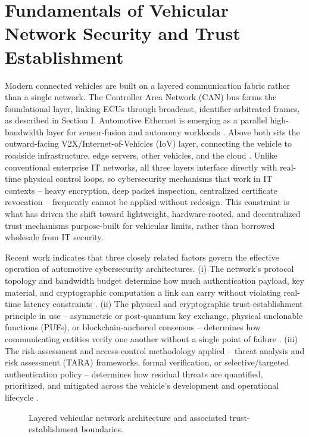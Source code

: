 \documentclass[journal]{IEEEtran}
\begin{document}
	\section{Fundamentals of Vehicular Network Security and Trust Establishment}
	
	Modern connected vehicles are built on a layered communication fabric
	rather than a single network. The Controller Area Network (CAN) bus
	forms the foundational layer, linking ECUs through broadcast,
	identifier-arbitrated frames, as described in Section I. Automotive
	Ethernet is emerging as a parallel high-bandwidth layer for
	sensor-fusion and autonomy workloads \cite{ref28}. Above both sits the
	outward-facing V2X/Internet-of-Vehicles (IoV) layer, connecting the
	vehicle to roadside infrastructure, edge servers, other vehicles, and
	the cloud \cite{ref13,ref14,ref15,ref16,ref17,ref18,ref19,ref20,ref30}.
	Unlike conventional enterprise IT networks, all three layers interface
	directly with real-time physical control loops, so cybersecurity
	mechanisms that work in IT contexts -- heavy encryption, deep packet
	inspection, centralized certificate revocation -- frequently cannot be
	applied without redesign. This constraint is what has driven the shift
	toward lightweight, hardware-rooted, and decentralized trust mechanisms
	purpose-built for vehicular limits, rather than borrowed wholesale from
	IT security.
	
	Recent work indicates that three closely related factors govern the
	effective operation of automotive cybersecurity architectures. (i) The
	network's protocol topology and bandwidth budget determine how much
	authentication payload, key material, and cryptographic computation a
	link can carry without violating real-time latency constraints
	\cite{ref21}. (ii) The physical and cryptographic trust-establishment
	principle in use -- asymmetric or post-quantum key exchange, physical
	unclonable functions (PUFs), or blockchain-anchored consensus --
	determines how communicating entities verify one another without a
	single point of failure \cite{ref13,ref14,ref15,ref16,ref17,ref18,ref19,ref20,ref22}.
	(iii) The risk-assessment and access-control methodology applied --
	threat analysis and risk assessment (TARA) frameworks, formal
	verification, or selective/targeted authentication policy -- determines
	how residual threats are quantified, prioritized, and mitigated across
	the vehicle's development and operational lifecycle
	\cite{ref29,ref30}.
	
	\begin{figure}[t]
		\centering
		\caption{Layered vehicular network architecture and associated
			trust-establishment boundaries.}
		\label{fig:layered_arch}
	\end{figure}
	
\end{document}
